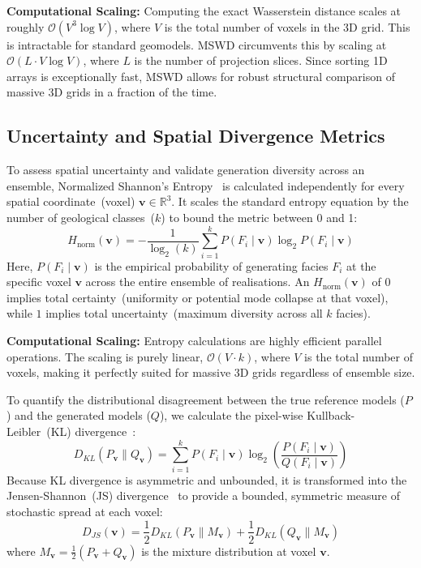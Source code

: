 \textbf{Computational Scaling:} Computing the exact Wasserstein distance scales at roughly $\mathcal{O}(V^3 \log V)$, where $V$ is the total number of voxels in the 3D grid. This is intractable for standard geomodels. MSWD circumvents this by scaling at $\mathcal{O}(L \cdot V \log V)$, where $L$ is the number of projection slices. Since sorting 1D arrays is exceptionally fast, MSWD allows for robust structural comparison of massive 3D grids in a fraction of the time.

\subsection{Uncertainty and Spatial Divergence Metrics}
To assess spatial uncertainty and validate generation diversity across an ensemble, Normalized Shannon's Entropy~\parencite{shannon1948mathematical} is calculated independently for every spatial coordinate~(voxel) $\mathbf{v} \in \mathbb{R}^3$. It scales the standard entropy equation by the number of geological classes~($k$) to bound the metric between 0 and 1:
\begin{equation}\label{eq:entropy_pixel}
    H_{\text{norm}}(\mathbf{v}) = -\frac{1}{\log_2(k)} \sum_{i=1}^{k} P(F_i \mid \mathbf{v}) \log_2 P(F_i \mid \mathbf{v})
\end{equation}
Here, $P(F_i \mid \mathbf{v})$ is the empirical probability of generating facies $F_i$ at the specific voxel $\mathbf{v}$ across the entire ensemble of realisations. An $H_{\text{norm}}(\mathbf{v})$ of $0$ implies total certainty~(uniformity or potential mode collapse at that voxel), while $1$ implies total uncertainty~(maximum diversity across all $k$ facies).

\textbf{Computational Scaling:} Entropy calculations are highly efficient parallel operations. The scaling is purely linear, $\mathcal{O}(V \cdot k)$, where $V$ is the total number of voxels, making it perfectly suited for massive 3D grids regardless of ensemble size.

To quantify the distributional disagreement between the true reference models ($P$) and the generated models ($Q$), we calculate the pixel-wise Kullback-Leibler~(KL) divergence~\parencite{kullback1951information}:
\begin{equation}\label{eq:kl_div_pixel}
    D_{KL}(P_{\mathbf{v}} \parallel Q_{\mathbf{v}}) = \sum_{i=1}^{k} P(F_i \mid \mathbf{v}) \log_2\left(\frac{P(F_i \mid \mathbf{v})}{Q(F_i \mid \mathbf{v})}\right)
\end{equation}
Because KL divergence is asymmetric and unbounded, it is transformed into the Jensen-Shannon~(JS) divergence~\parencite{lin1991divergence} to provide a bounded, symmetric measure of stochastic spread at each voxel:
\begin{equation}\label{eq:js_div_pixel}
    D_{JS}(\mathbf{v}) = \frac{1}{2} D_{KL}(P_{\mathbf{v}} \parallel M_{\mathbf{v}}) + \frac{1}{2} D_{KL}(Q_{\mathbf{v}} \parallel M_{\mathbf{v}}) 
\end{equation}
where $M_{\mathbf{v}} = \frac{1}{2}(P_{\mathbf{v}} + Q_{\mathbf{v}})$ is the mixture distribution at voxel $\mathbf{v}$.

